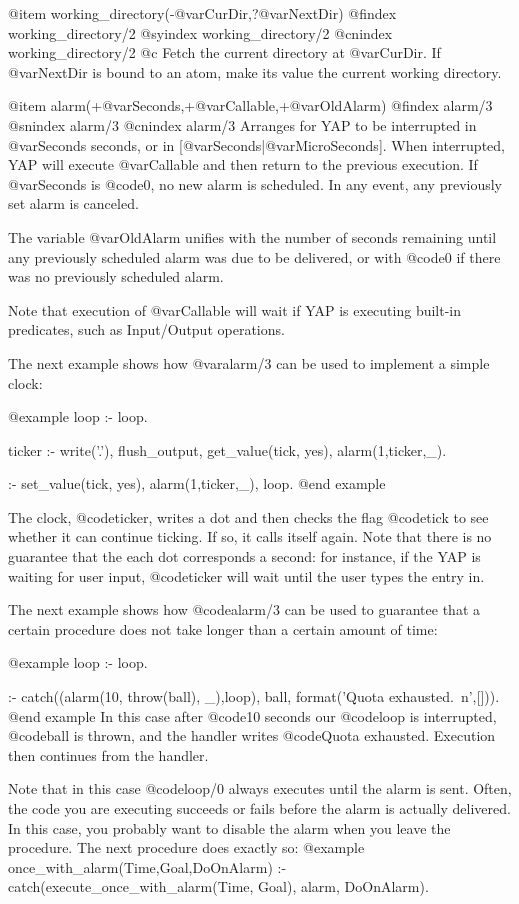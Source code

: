 {{{{{{@item working_directory(-@var{CurDir},?@var{NextDir})
@findex  working_directory/2
@syindex working_directory/2
@cnindex working_directory/2    @c 
Fetch the current directory at @var{CurDir}. If @var{NextDir} is bound
to an atom, make its value the current working directory.

@item alarm(+@var{Seconds},+@var{Callable},+@var{OldAlarm})
@findex alarm/3
@snindex alarm/3
@cnindex alarm/3
Arranges for YAP to be interrupted in @var{Seconds} seconds, or in
[@var{Seconds}|@var{MicroSeconds}]. When interrupted, YAP will execute
@var{Callable} and then return to the previous execution. If
@var{Seconds} is @code{0}, no new alarm is scheduled. In any event,
any previously set alarm is canceled.

The variable @var{OldAlarm} unifies with the number of seconds remaining
until any previously scheduled alarm was due to be delivered, or with
@code{0} if there was no previously scheduled alarm.

Note that execution of @var{Callable} will wait if YAP is
executing built-in predicates, such as Input/Output operations.

The next example shows how @var{alarm/3} can be used to implement a
simple clock:

@example
loop :- loop.

ticker :- write('.'), flush_output,
          get_value(tick, yes),
          alarm(1,ticker,_).

:- set_value(tick, yes), alarm(1,ticker,_), loop.
@end example

The clock, @code{ticker}, writes a dot and then checks the flag
@code{tick} to see whether it can continue ticking. If so, it calls
itself again. Note that there is no guarantee that the each dot
corresponds a second: for instance, if the YAP is waiting for
user input, @code{ticker} will wait until the user types the entry in.

The next example shows how @code{alarm/3} can be used to guarantee that
a certain procedure does not take longer than a certain amount of time:

@example
loop :- loop.

:-   catch((alarm(10, throw(ball), _),loop),
        ball,
        format('Quota exhausted.~n',[])).
@end example
In this case after @code{10} seconds our @code{loop} is interrupted,
@code{ball} is thrown,  and the handler writes @code{Quota exhausted}.
Execution then continues from the handler.

Note that in this case @code{loop/0} always executes until the alarm is
sent. Often, the code you are executing succeeds or fails before the
alarm is actually delivered. In this case, you probably want to disable
the alarm when you leave the procedure. The next procedure does exactly so:
@example
once_with_alarm(Time,Goal,DoOnAlarm) :-
   catch(execute_once_with_alarm(Time, Goal), alarm, DoOnAlarm).

}}}}}}
